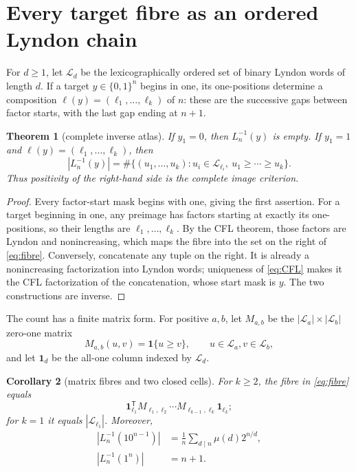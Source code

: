 \documentclass[10pt,a4paper]{amsart}
\newtheorem{theorem}{Theorem}[section]
\newtheorem{corollary}[theorem]{Corollary}
\theoremstyle{definition}
\theoremstyle{remark}
\newcommand{\Bn}{\{0,1\}^n}
\newcommand{\Lyn}{\mathcal L}
\newcommand{\ind}{\mathbf 1}
\begin{document}
\section{Every target fibre as an ordered Lyndon chain}

For $d\ge1$, let $\Lyn_d$ be the lexicographically ordered set of binary
Lyndon words of length $d$.  If a target $y\in\Bn$ begins in one, its
one-positions determine a composition
$\ell(y)=(\ell_1,\ldots,\ell_k)$ of $n$: these are the successive gaps
between factor starts, with the last gap ending at $n+1$.

\begin{theorem}[complete inverse atlas]\label{thm:fibre}
If $y_1=0$, then $L_n^{-1}(y)$ is empty.  If $y_1=1$ and
$\ell(y)=(\ell_1,\ldots,\ell_k)$, then
\begin{equation}\label{eq:fibre}
 |L_n^{-1}(y)|
 =\#\{(u_1,\ldots,u_k):u_i\in\Lyn_{\ell_i},\ 
                         u_1\ge\cdots\ge u_k\}.
\end{equation}
Thus positivity of the right-hand side is the complete image criterion.
\end{theorem}

\par\smallskip
\begin{proof}
Every factor-start mask begins with one, giving the first assertion.  For a
target beginning in one, any preimage has factors starting at exactly its
one-positions, so their lengths are $\ell_1,\ldots,\ell_k$.  By the CFL
theorem, those factors are Lyndon and nonincreasing, which maps the fibre into
the set on the right of \eqref{eq:fibre}.  Conversely, concatenate any tuple
on the right.  It is already a nonincreasing factorization into Lyndon words;
uniqueness of \eqref{eq:CFL} makes it the CFL factorization of the
concatenation, whose start mask is $y$.  The two constructions are inverse.
\end{proof}

\par\smallskip
The count has a finite matrix form.  For positive $a,b$, let
$M_{a,b}$ be the $|\Lyn_a|\times|\Lyn_b|$ zero-one matrix
\begin{equation}\label{eq:matrix}
 M_{a,b}(u,v)=\ind\{u\ge v\},\qquad u\in\Lyn_a, v\in\Lyn_b,
\end{equation}
and let $\mathbf 1_d$ be the all-one column indexed by $\Lyn_d$.

\par\smallskip
\begin{corollary}[matrix fibres and two closed cells]\label{cor:special}
For $k\ge2$, the fibre in \eqref{eq:fibre} equals
\begin{equation}\label{eq:product}
 \mathbf 1_{\ell_1}^{\mathsf T}
 M_{\ell_1,\ell_2}\cdots
 M_{\ell_{k-1},\ell_k}\mathbf 1_{\ell_k};
\end{equation}
for $k=1$ it equals $|\Lyn_{\ell_1}|$.  Moreover,
\begin{align}
 |L_n^{-1}(10^{n-1})|
   &=\frac1n\sum_{d\mid n}\mu(d)2^{n/d},\label{eq:onefactor}\\
 |L_n^{-1}(1^n)|&=n+1.\label{eq:allstarts}
\end{align}
\end{corollary}
\end{document}
